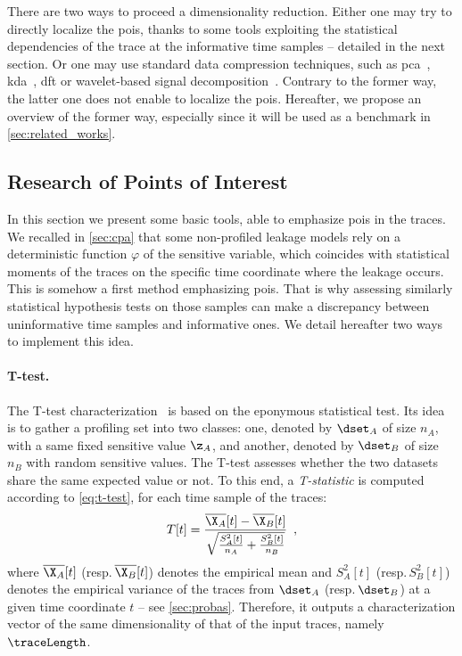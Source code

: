 There are two ways to proceed a dimensionality reduction.
Either one may try to directly localize the \glspl{poi}, thanks to some tools exploiting the statistical dependencies of the trace at the informative time samples -- detailed in the next section.
Or one may use standard data compression techniques, such as \gls{pca}~\cite{cagli_enhancing_2016,standaert_using_2008,eisenbarth_building_2010,choudary_efficient_2014,choudary_efficient_2015}, \gls{kda}~\cite{cagli_kernel_2017}, \gls{dft} or wavelet-based signal decomposition~\cite{destouet_wavelet_2020}.
Contrary to the former way, the latter one does not enable to localize the \glspl{poi}.
Hereafter, we propose an overview of the former way, especially since it will be used as a benchmark in \autoref{sec:related_works}.

\subsection{Research of Points of Interest}
\label{sec:PoIs}
In this section we present some basic tools, able to emphasize \glspl{poi} in the traces.
We recalled in \autoref{sec:cpa} that some non-profiled leakage models rely on a deterministic function \(\varphi\) of the sensitive variable, which coincides with statistical moments of the traces on the specific time coordinate where the leakage occurs.
This is somehow a first method emphasizing \glspl{poi}.
That is why assessing similarly statistical hypothesis tests on those samples can make a discrepancy between uninformative time samples and informative ones.
We detail hereafter two ways to implement this idea.

\paragraph{T-test.}
The T-test characterization~\cite{mather_does_2013} is based on the eponymous statistical test.
Its idea is to gather a profiling set into two classes: one, denoted by \(\dset_A\) of size \(n_A\), with a same fixed sensitive value \(\z_A\), and another, denoted by \(\dset_B\) of size \(n_B\) with random sensitive values.
The T-test assesses whether the two datasets share the same expected value or not.
To this end, a \emph{T-statistic} is computed according to \autoref{eq:t-test}, for each time sample of the traces:
\begin{equation}
    T[t] = \frac{\overline{\X_A}[t] - \overline{\X_B}[t]}{\sqrt{\frac{S_A^2[t]}{n_A}+\frac{S_B^2[t]}{n_B}}} \enspace ,
    \label{eq:t-test}
\end{equation}
where \(\overline{\X_A}[t]\) (resp.\,\(\overline{\X_B}[t]\)) denotes the empirical mean and \(S_A^2[t]\) (resp.\,\(S_B^2[t]\)) denotes the empirical variance of the traces from \(\dset_A\) (resp.\,\(\dset_B\)) at a given time coordinate \(t\) -- see \autoref{sec:probas}.
Therefore, it outputs a characterization vector of the same dimensionality of that of the input traces, namely \(\traceLength\).

